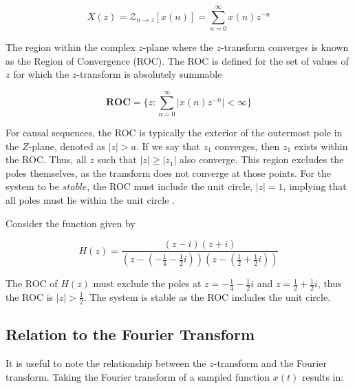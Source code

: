 \documentclass[a4paper]{report}
\begin{document}
\begin{equation}\label{unilateral_z-transform}
X(z) = \mathcal{Z}_{n \rightarrow z}[x(n)] = \sum^{\infty}_{n = 0} x(n)z^{-n}
\end{equation}

The region within the complex $z$-plane where the $z$-transform converges is known as the Region of Convergence (ROC). The ROC is defined for the set of values of $z$ for which the $z$-transform is absolutely summable

\begin{equation}\label{roc}
\textbf{ROC} = \Biggl\{ z : \sum^{\infty}_{n = 0} |x(n)z^{-n}| < \infty \Biggr\}
\end{equation}

For causal sequences, the ROC is typically the exterior of the outermost pole in the $Z$-plane, denoted as $|z| > a$. If we say that $z_1$ converges, then $z_1$ exists within the ROC. Thus, all $z$ such that $|z| \geq |z_1|$ also converge. This region excludes the poles themselves, as the transform does not converge at those points. For the system to be $stable$, the ROC must include the unit circle, $|z| = 1$, implying that all poles must lie within the unit circle \citep{loveless2021guido}.

\begin{example}\label{example:roc_poles}
    Consider the function given by
    
    \begin{equation}
        H(z) = \frac{(z - i)(z + i)}{\left(z - \left(-\frac{1}{4} - \frac{1}{2}i\right)\right)\left(z - \left(\frac{1}{2} + \frac{1}{2}i\right)\right)}
    \end{equation}
    
    The ROC of $H(z)$ must exclude the poles at $z = -\frac{1}{4} - \frac{1}{2}i$ and $z = \frac{1}{2} + \frac{1}{2}i$, thus the ROC is $|z| > \frac{1}{2}$. The system is stable as the ROC includes the unit circle.

\end{example}

\subsection{Relation to the Fourier Transform}\label{rs_fourier_transform}
It is useful to note the relationship between the $z$-transform and the Fourier transform. Taking the Fourier transform of a sampled function $x(t)$ results in:
\end{document}
